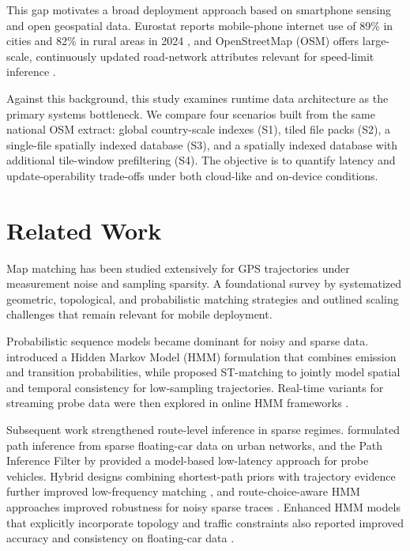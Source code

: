 \documentclass{article}
\begin{document}
This gap motivates a broad deployment approach based on smartphone sensing and open geospatial data. Eurostat reports mobile-phone internet use of 89\% in cities and 82\% in rural areas in 2024 \cite{eurostat_mobile_internet_2024}, and OpenStreetMap (OSM) offers large-scale, continuously updated road-network attributes relevant for speed-limit inference \cite{osmwiki_highways,osmwiki_maxspeed}.

Against this background, this study examines runtime data architecture as the primary systems bottleneck. We compare four scenarios built from the same national OSM extract: global country-scale indexes (S1), tiled file packs (S2), a single-file spatially indexed database (S3), and a spatially indexed database with additional tile-window prefiltering (S4). The objective is to quantify latency and update-operability trade-offs under both cloud-like and on-device conditions.

\section{Related Work}
Map matching has been studied extensively for GPS trajectories under measurement noise and sampling sparsity. A foundational survey by \citet{quddus2007} systematized geometric, topological, and probabilistic matching strategies and outlined scaling challenges that remain relevant for mobile deployment.

Probabilistic sequence models became dominant for noisy and sparse data. \citet{newson2009} introduced a Hidden Markov Model (HMM) formulation that combines emission and transition probabilities, while \citet{lou2009} proposed ST-matching to jointly model spatial and temporal consistency for low-sampling trajectories. Real-time variants for streaming probe data were then explored in online HMM frameworks \citep{goh2012,he2013}.

Subsequent work strengthened route-level inference in sparse regimes. \citet{rahmani2013} formulated path inference from sparse floating-car data on urban networks, and the Path Inference Filter by \citet{hunter2014} provided a model-based low-latency approach for probe vehicles. Hybrid designs combining shortest-path priors with trajectory evidence further improved low-frequency matching \citep{quddus2015}, and route-choice-aware HMM approaches improved robustness for noisy sparse traces \citep{jagadeesh2017}. Enhanced HMM models that explicitly incorporate topology and traffic constraints also reported improved accuracy and consistency on floating-car data \citep{che2018}.
\end{document}
